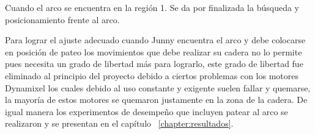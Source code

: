 Cuando el arco se encuentra en la regi\'on 1. Se da por finalizada la búsqueda y posicionamiento frente al arco.  

Para lograr el ajuste adecuado cuando Junny encuentra el arco y debe colocarse en posici\'on de pateo los movimientos que debe realizar su cadera no lo permite pues necesita un grado de libertad m\'as para lograrlo, este grado de libertad fue eliminado al principio del proyecto debido a ciertos problemas con los motores Dynamixel los cuales debido al uso constante y exigente suelen fallar y quemarse, la mayor\'ia de estos motores se quemaron justamente en la zona de la cadera. De igual manera los experimentos de desempe\~no que incluyen patear al arco se realizaron y se presentan en el cap\'itulo ~\ref{chapter:resultados}.






